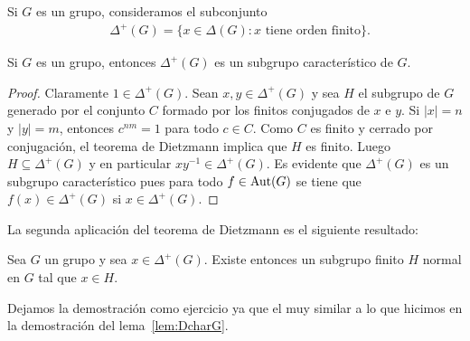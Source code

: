 Si $G$ es un grupo, consideramos el subconjunto %
\begin{align*}
	&\Delta^+(G)=\{x\in \Delta(G):\text{$x$ tiene orden finito}\}.
\end{align*}

\begin{lemma}
	\label{lem:DcharG}
	Si $G$ es un grupo, entonces $\Delta^+(G)$ es un subgrupo
	característico de $G$.
\end{lemma}

\begin{proof}
	Claramente $1\in\Delta^+(G)$. 
	Sean $x,y\in\Delta^+(G)$ y sea $H$ el subgrupo de $G$ generado por el
	conjunto $C$ formado por los finitos conjugados de $x$ e $y$. Si $|x|=n$ y
	$|y|=m$, entonces $c^{nm}=1$ para todo $c\in C$. Como $C$ es 
	finito y cerrado por conjugación, el teorema de Dietzmann implica que $H$ es
	finito. Luego $H\subseteq\Delta^+(G)$ y en particular $xy^{-1}\in\Delta^+(G)$.  Es
	evidente que $\Delta^+(G)$ es un subgrupo característico pues para todo
	$f\in\operatorname{Aut}(G)$ se tiene que $f(x)\in\Delta^+(G)$ si $x\in\Delta^+(G)$.
\end{proof}

La segunda aplicación del teorema de Dietzmann es el siguiente resultado:

\begin{lemma}
	\label{lem:Connel}
	Sea $G$ un grupo y sea  $x\in\Delta^+(G)$.  Existe entonces un subgrupo
	finito $H$ normal en $G$ tal que $x\in H$.
\end{lemma}

Dejamos la demostración como ejercicio ya que el muy similar a lo que hicimos
en la demostración del lema~\ref{lem:DcharG}.


